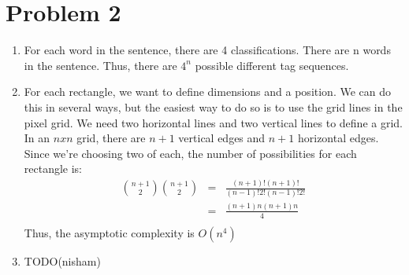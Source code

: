 \documentclass[12pt]{article}
\begin{document}
\section*{Problem 2}

\begin{enumerate}[label=(\alph*)]
  \item For each word in the sentence, there are 4 classifications. There are n words in the sentence. Thus, there are $4^n$ possible different tag sequences.
  
  \item For each rectangle, we want to define dimensions and a position. We can do this in several ways, but the easiest way to do so is to use the grid lines in the pixel grid. We need two horizontal lines and two vertical lines to define a grid. In an $n x n$ grid, there are $n + 1$ vertical edges and $n + 1$ horizontal edges. Since we're choosing two of each, the number of possibilities for each rectangle is:
  \begin{eqnarray*}
  \binom{n+1}{2}\binom{n+1}{2} &=& \frac{(n+1)!(n+1)!}{(n-1)!2!(n-1)!2!}\\
  &=& \frac{(n+1)n(n+1)n}{4}\\
  \end{eqnarray*}
  Thus, the asymptotic complexity is $O(n^4)$

  \item TODO(nisham)
\end{enumerate}
\end{document}
